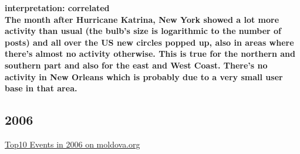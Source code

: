 \documentclass[11pt,a4paper,english]{article}
\begin{document}
\begin{itemize}
					\bf interpretation: \rm correlated
					\\ The month after Hurricane Katrina, New York showed a lot more activity than usual (the bulb's size is logarithmic to the number of posts) and all over the US new circles popped up, also in areas where there's almost no activity otherwise. This is true for the northern and southern part and also for the east and West Coast. There's no activity in New Orleans which is probably due to a very small user base in that area.
					
					
												
				\end{itemize}
			
			\subsection{2006}
			\href{http://social.moldova.org/news/10-most-important-world-events-of-2006-217385-eng.html}{Top10 Events in 2006 on moldova.org}
\end{document}
